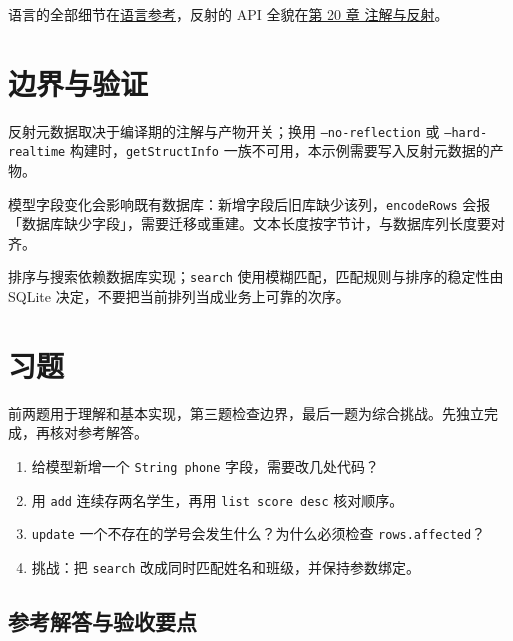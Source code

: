 语言的全部细节在\href{https://gitee.com/rabbitc999/chali/blob/master/doc/04-language-reference.md}{语言参考}，反射的 API 全貌在\hyperref[ch:20]{第 20 章 注解与反射}。

\section{边界与验证}

反射元数据取决于编译期的注解与产物开关；换用 \texttt{--no-reflection} 或 \texttt{--hard-realtime} 构建时，\texttt{get\allowbreak{}Struct\allowbreak{}Info} 一族不可用，本示例需要写入反射元数据的产物。

模型字段变化会影响既有数据库：新增字段后旧库缺少该列，\texttt{encode\allowbreak{}Rows} 会报「数据库缺少字段」，需要迁移或重建。文本长度按字节计，与数据库列长度要对齐。

排序与搜索依赖数据库实现；\texttt{search} 使用模糊匹配，匹配规则与排序的稳定性由SQLite 决定，不要把当前排列当成业务上可靠的次序。

\section{习题}

前两题用于理解和基本实现，第三题检查边界，最后一题为综合挑战。先独立完成，再核对参考解答。

\begin{enumerate}

\item 给模型新增一个 \texttt{String phone} 字段，需要改几处代码？

\item 用 \texttt{add} 连续存两名学生，再用 \texttt{list score desc} 核对顺序。

\item \texttt{update} 一个不存在的学号会发生什么？为什么必须检查 \texttt{rows.\allowbreak{}affected}？

\item 挑战：把 \texttt{search} 改成同时匹配姓名和班级，并保持参数绑定。

\end{enumerate}

\subsection*{参考解答与验收要点}


